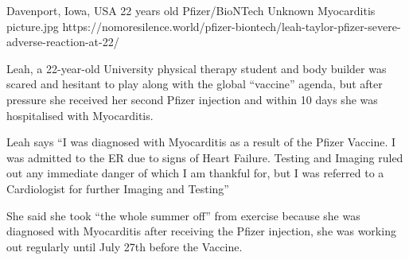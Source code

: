 {Davenport, Iowa, USA}
{22 years old}
{Pfizer/BioNTech}
{Unknown}
{Myocarditis}
{picture.jpg}
{https://nomoresilence.world/pfizer-biontech/leah-taylor-pfizer-severe-adverse-reaction-at-22/}
{

Leah, a 22-year-old University physical therapy student and body builder was
scared and hesitant to play along with the global “vaccine” agenda, but after
pressure she received her second Pfizer injection and within 10 days she was
hospitalised with Myocarditis.

Leah says “I was diagnosed with Myocarditis as a result of the Pfizer Vaccine. I
was admitted to the ER due to signs of Heart Failure. Testing and Imaging ruled
out any immediate danger of which I am thankful for, but I was referred to a
Cardiologist for further Imaging and Testing”

She said she took “the whole summer off” from exercise because she was diagnosed with Myocarditis after receiving the Pfizer injection, she was working out regularly until July 27th before the Vaccine.
}

